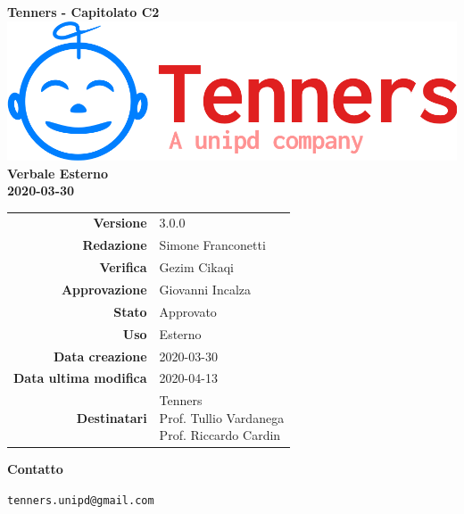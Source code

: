 \begin{titlepage}
	\begin{center}
		\large \textbf{Tenners - Capitolato C2}
		\vfill
		\includegraphics[scale = 0.3]{./res/img/logo.png}\\
		\vfill
		\Huge \textbf{Verbale Esterno} \\
		\textbf {2020-03-30}

        \vfill
        \large

        \begin{tabular}{r|l}
        	\textbf{Versione} & 3.0.0 \\
        	\textbf{Redazione} & Simone Franconetti \\
        	\textbf{Verifica} &  Gezim Cikaqi \\
        	\textbf{Approvazione} & Giovanni Incalza\\
        	\textbf{Stato} & Approvato \\
        	\textbf{Uso} &  Esterno\\
        	\textbf{Data creazione} &  2020-03-30\\
        	\textbf{Data ultima modifica} & 2020-04-13 \\
        	\textbf{Destinatari} & \parbox[t]{5cm}{Tenners \\ Prof. Tullio Vardanega\\ Prof. Riccardo Cardin}
        \end{tabular}
    	\vfill
    	\normalsize
    	\vfill
    	\textbf{Contatto}

    	\texttt{tenners.unipd@gmail.com}

	\end{center}
\end{titlepage}
